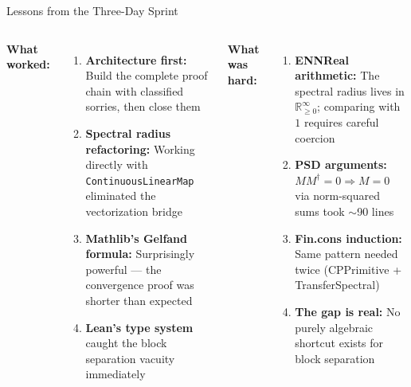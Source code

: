 \documentclass[aspectratio=169,10pt]{beamer}
\begin{document}
\begin{frame}{Lessons from the Three-Day Sprint}
\begin{columns}[T]
\textbf{\textcolor{leangreen}{What worked:}}
\begin{enumerate}\itemsep0.15em
  \item {\small \textbf{Architecture first:} Build the complete proof chain with classified sorries, then close them}
  \item {\small \textbf{Spectral radius refactoring:} Working directly with \texttt{ContinuousLinearMap} eliminated the vectorization bridge}
  \item {\small \textbf{Mathlib's Gelfand formula:} Surprisingly powerful --- the convergence proof was shorter than expected}
  \item {\small \textbf{Lean's type system} caught the block separation vacuity immediately}
\end{enumerate}

\textbf{\textcolor{amber}{What was hard:}}
\begin{enumerate}\itemsep0.15em
  \item {\small \textbf{ENNReal arithmetic:} The spectral radius lives in $\mathbb{R}_{\geq 0}^\infty$; comparing with $1$ requires careful coercion}
  \item {\small \textbf{PSD arguments:} $M M^\dagger = 0 \Rightarrow M = 0$ via norm-squared sums took $\sim$90 lines}
  \item {\small \textbf{Fin.cons induction:} Same pattern needed twice (CPPrimitive + TransferSpectral)}
  \item {\small \textbf{The gap is real:} No purely algebraic shortcut exists for block separation}
\end{enumerate}
\end{columns}
\end{frame}
\end{document}
